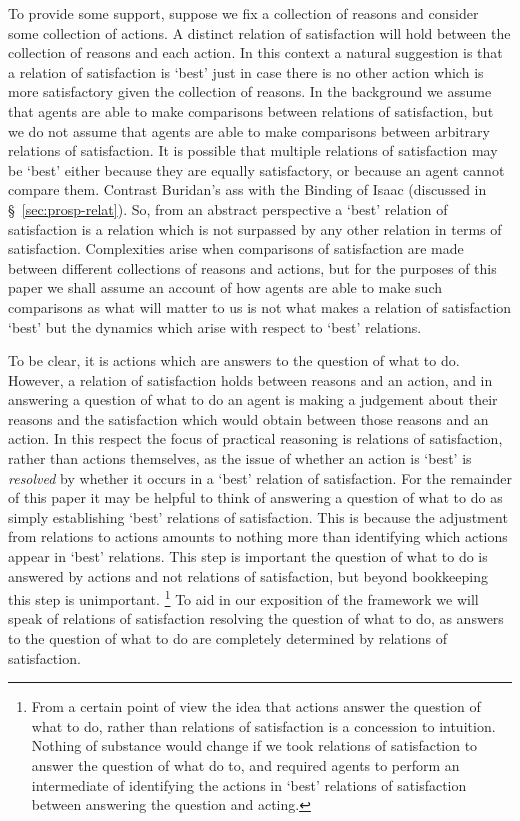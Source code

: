 \documentclass[10pt]{article}
\begin{document}
To provide some support, suppose we fix a collection of reasons and consider some collection of actions.
A distinct relation of satisfaction will hold between the collection of reasons and each action.
In this context a natural suggestion is that a relation of satisfaction is `best' just in case there is no other action which is more satisfactory given the collection of reasons.
In the background we assume that agents are able to make comparisons between relations of satisfaction, but we do not assume that agents are able to make comparisons between arbitrary relations of satisfaction.
It is possible that multiple relations of satisfaction may be `best' either because they are equally satisfactory, or because an agent cannot compare them.
Contrast Buridan's ass with the Binding of Isaac (discussed in \S~\ref{sec:prosp-relat}).
So, from an abstract perspective a `best' relation of satisfaction is a relation which is not surpassed by any other relation in terms of satisfaction.
Complexities arise when comparisons of satisfaction are made between different collections of reasons and actions, but for the purposes of this paper we shall assume an account of how agents are able to make such comparisons as what will matter to us is not what makes a relation of satisfaction `best' but the dynamics which arise with respect to `best' relations.

To be clear, it is actions which are answers to the question of what to do.
However, a relation of satisfaction holds between reasons and an action, and in answering a question of what to do an agent is making a judgement about their reasons and the satisfaction which would obtain between those reasons and an action.
In this respect the focus of practical reasoning is relations of satisfaction, rather than actions themselves, as the issue of whether an action is `best' is \emph{resolved} by whether it occurs in a `best' relation of satisfaction.
For the remainder of this paper it may be helpful to think of answering a question of what to do as simply establishing `best' relations of satisfaction.
This is because the adjustment from relations to actions amounts to nothing more than identifying which actions appear in `best' relations.
This step is important the question of what to do is answered by actions and not relations of satisfaction, but beyond bookkeeping this step is unimportant.\nolinebreak
\footnote{From a certain point of view the idea that actions answer the question of what to do, rather than relations of satisfaction is a concession to intuition.
  Nothing of substance would change if we took relations of satisfaction to answer the question of what do to, and required agents to perform an intermediate of identifying the actions in `best' relations of satisfaction between answering the question and acting.}
To aid in our exposition of the framework we will speak of relations of satisfaction resolving the question of what to do, as answers to the question of what to do are completely determined by relations of satisfaction.
\end{document}
